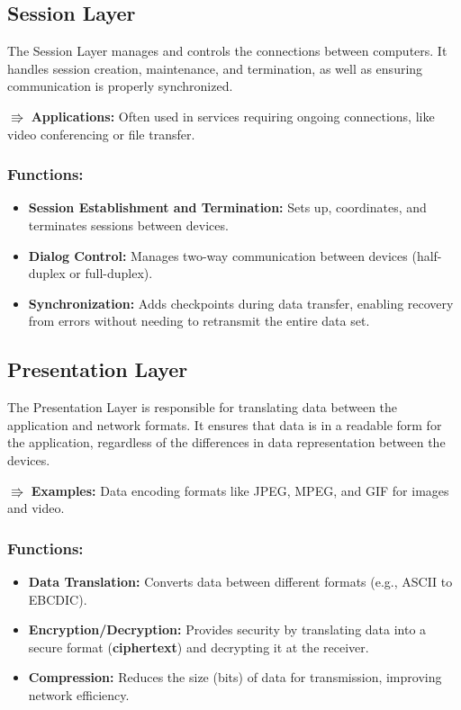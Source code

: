 \vspace{1em}
\subsection{Session Layer}
The Session Layer manages and controls the connections between computers. It handles session creation, maintenance, and termination, as well as ensuring communication is properly synchronized.

$\Rrightarrow$ \textbf{Applications:} Often used in services requiring ongoing connections, like video conferencing or file transfer.

\subsubsection{Functions:}
\begin{itemize}
   \item \textbf{Session Establishment and Termination:}
   Sets up, coordinates, and terminates sessions between devices.
   \item \textbf{Dialog Control:}
   Manages two-way communication between devices (half-duplex or full-duplex).
   \item \textbf{Synchronization:}
   Adds checkpoints during data transfer, enabling recovery from errors without needing to retransmit the entire data set.
\end{itemize}



\vspace{1em}
\subsection{Presentation Layer}
The Presentation Layer is responsible for translating data between the application and network formats. It ensures that data is in a readable form for the application, regardless of the differences in data representation between the devices.

$\Rrightarrow$ \textbf{Examples:} Data encoding formats like JPEG, MPEG, and GIF for images and video.

\subsubsection{Functions:}
\begin{itemize}
   \item \textbf{Data Translation:}
   Converts data between different formats (e.g., ASCII to EBCDIC).
   \item \textbf{Encryption/Decryption:}
   Provides security by translating data into a secure format (\textbf{ciphertext}) and decrypting it at the receiver.
   \item \textbf{Compression:}
   Reduces the size (bits) of data for transmission, improving network efficiency.
\end{itemize}



